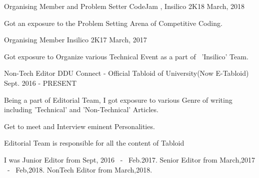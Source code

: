 


\begin{cventries}


\cventry
{Organising Member and Problem Setter} %
{CodeJam , Insilico 2K18} %
{March, 2018} %
{} %
{ %
\begin{cvitems}
\item {Got an exposure to the Problem Setting Arena of Competitive Coding.}
\end{cvitems}
}


\cventry
{Organising Member} %
{Insilico 2K17} %
{March, 2017} %
{} %
{ %
\begin{cvitems}
\item {Got exposure to Organize various Technical Event as a part of ~'Insilico' Team.}
\end{cvitems}
}


\cventry
{Non-Tech Editor} %
{DDU Connect - Official Tabloid of University(Now E-Tabloid)} %
{Sept. 2016 - PRESENT} %
{} %
{ %
\begin{cvitems}
\item {Being a part of Editorial Team, I got exposure to various Genre of writing including 'Technical' and 'Non-Technical' Articles.}
\item {Get to meet and Interview eminent Personalities.}
\item {Editorial Team is responsible for all the content of Tabloid}
\item {I was Junior Editor from Sept, 2016 ~-~ Feb.2017. Senior Editor from March,2017 ~-~ Feb,2018. NonTech Editor from March,2018.}
\end{cvitems}
}


\end{cventries}
